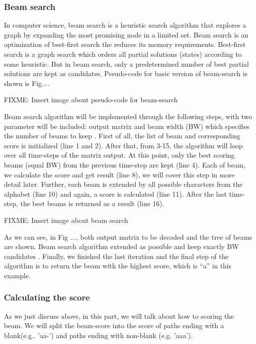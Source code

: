       \subsubsection{ Beam search }
      In computer science, beam search is a heuristic search algorithm that
      explores a graph by expanding the most promising node in a limited set.
      Beam search is an optimization of best-first search the reduces its memory
      requirements. Best-first search is a graph search which orders all
      partial solutions (states) according to some heuristic. But in beam search,
      only a predetermined number of best partial solutions are kept as candidates.
      Pseudo-code for basic version of beam-search is shown is Fig....

      FIXME: Insert image about pseudo-code for beam-search
      
      Beam search algorithm will be implemented through the following steps, with two
      parameter will be included: output matrix and beam width (BW) which specifies the number
      of beams to keep . First of all, the list of beam and corresponding score is 
      initialized (line 1 and 2). After that, from 3-15, the algorithm will loop over all time-steps
      of the matrix output. At this point, only the best scoring beams (equal BW) from the previous
      time-step are kept (line 4). Each of beam, we calculate the score and get result (line 8), we will cover
      this step in more detail later. Further, each beam is extended by all possible characters from
      the alphabet (line 10) and again, a score is calculated (line 11). After the last time-step,
      the best beams is returned as a result (line 16).

      FIXME: Insert image about beam search

      As we can see, in Fig ..., both output matrix to be decoded and the tree of beams are shown. 
      Beam search algorithm extended as possible and keep exactly BW candidates . Finally,
      we finished the last iteration and the final step of the algorithm is to return the beam 
      with the highest score, which is “a” in this example.
      
      \subsubsection{ Calculating the score }
      As we just discuss above, in this part, we will talk about how to scoring the beam.
      We will split the beam-score into the score of paths ending with a blank(e.g.. 'aa-')
      and paths ending with non-blank (e.g. 'aaa'). 
      
